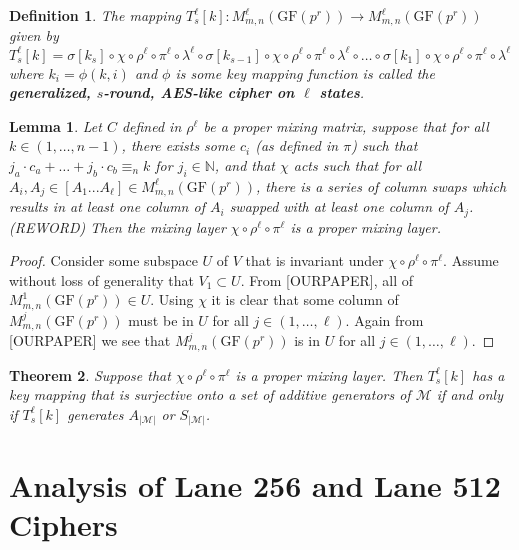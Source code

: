 \documentclass[11pt]{amsart}
\newcommand{\naturals}{{\mathbb N}}
\newcommand{\MM}{\mathcal{M}}
\newcommand{\GF}{\mathrm{GF}}
\newtheorem{definition}{{\bf Definition}}
\newtheorem{theorem}{{\bf Theorem }}
\newtheorem{lemma}[theorem]{{\bf Lemma }}
\begin{document}
\begin{definition}
The mapping $T^\ell_s[k] : M^\ell_{m,n}(\GF(p^r)) \to M^\ell_{m,n}(\GF(p^r))$ given by $T^\ell_s[k] = \sigma[k_s] \circ \chi \circ \rho^\ell \circ \pi^\ell \circ \lambda^\ell \circ \sigma[k_{s-1}] \circ \chi \circ \rho^\ell \circ \pi^\ell \circ \lambda^\ell \circ \dots \circ \sigma[k_1] \circ \chi \circ \rho^\ell \circ \pi^\ell \circ \lambda^\ell $ where $k_i = \phi(k,i)$ and $\phi$ is some key mapping function is called the {\bf generalized, $s$-round, AES-like cipher on $\ell$ states}.
\end{definition}



\begin{lemma}
Let $C$ defined in $\rho^\ell$ be a proper mixing matrix, suppose that for all $k \in (1,\dots,n-1)$, there exists some $c_i$ (as defined in $\pi$) such that $j_a \cdot c_a + \dots + j_b \cdot c_b \equiv_n k$ for $j_i \in \naturals$, and that $\chi$ acts such that for all $A_i, A_j \in [A_1... A_\ell] \in M_{m,n}^\ell(\GF(p^r))$, there is a series of column swaps which results in at least one column of $A_i$ swapped with at least one column of $A_j$. (REWORD) Then the mixing layer $\chi \circ \rho^\ell \circ \pi^\ell$ is a proper mixing layer.
\end{lemma}
\begin{proof}
Consider some subspace $U$ of $V$ that is invariant under $\chi \circ \rho^\ell \circ \pi^\ell$. Assume without loss of generality that $V_1 \subset U$. From [OURPAPER], all of $M^1_{m,n}(\GF(p^r)) \in U$. Using $\chi$ it is clear that some column of $M^j_{m,n}(\GF(p^r))$ must be in $U$ for all $j \in (1, \dots, \ell)$. Again from [OURPAPER] we see that $M^j_{m,n}(\GF(p^r))$ is in $U$ for all $j \in (1, \dots, \ell)$.
\end{proof}

\begin{theorem}
Suppose that $\chi \circ \rho^\ell \circ \pi^\ell$ is a proper mixing layer. Then $T^\ell_s[k]$ has a key mapping that is surjective onto a set of additive generators of $\MM$ if and only if $T^\ell_s[k]$ generates $A_{|\MM|}$ or $S_{|\MM|}$.
\end{theorem}




\section{Analysis of Lane 256 and Lane 512 Ciphers}
\end{document}
